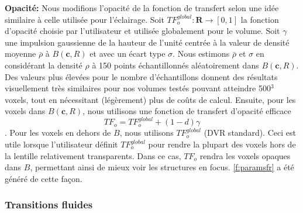 \par \textbf{Opacité:} Nous modifions l'opacité de la fonction de transfert selon une idée similaire à celle utilisée pour l'éclairage. Soit $ TF_{o}^{global}: \mathbf{R} \rightarrow [0,1] $ la fonction d'opacité choisie par l'utilisateur et utilisée globalement pour le volume. Soit $ \gamma $  une impulsion gaussienne de la hauteur de l'unité centrée à la valeur de densité moyenne $ \bar{\rho} $ à $ B(\mathbf{c}, R) $ et avec un écart type $ \sigma $. Nous estimons $ \bar{\rho} $ et $ \sigma $ en considérant la densité $ \rho $ à 150 points échantillonnés aléatoirement dans $ B(\mathbf{c}, R) $. Des valeurs plus élevées pour le nombre d'échantillons donnent des résultats visuellement très similaires pour nos volumes testés pouvant atteindre 500$^3$ voxels, tout en nécessitant (légèrement) plus de coûts de calcul. Ensuite, pour les voxels dans $ B(\mathbf{c}, R) $, nous utilisons une fonction de transfert d'opacité efficace
\begin{equation}
TF_o = TF_{o}^{global} + (1-d) \gamma
\end{equation}.
 Pour les voxels en dehors de $ B $, nous utilisons $ TF_{o}^{global} $ (DVR standard).
Ceci est utile lorsque l'utilisateur définit $ TF_{o}^{global} $ pour rendre la plupart des voxels hors de la lentille relativement transparents. Dans ce cas, $ TF_o $ rendra les voxels opaques dans $ B $, permettant ainsi de mieux voir les structures en focus. \autoref{f:paramsfr} a été généré de cette façon.

\subsubsection{Transitions fluides}

